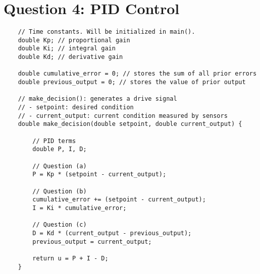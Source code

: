 \documentclass{article}
\begin{document}
	\section*{Question 4: PID Control}
	\begin{lstlisting}
	// Time constants. Will be initialized in main().
	double Kp; // proportional gain
	double Ki; // integral gain
	double Kd; // derivative gain
	
	double cumulative_error = 0; // stores the sum of all prior errors
	double previous_output = 0; // stores the value of prior output
	
	// make_decision(): generates a drive signal
	// - setpoint: desired condition
	// - current_output: current condition measured by sensors
	double make_decision(double setpoint, double current_output) {
	
		// PID terms
		double P, I, D;
		
		// Question (a)
		P = Kp * (setpoint - current_output);
		
		// Question (b)
		cumulative_error += (setpoint - current_output);
		I = Ki * cumulative_error;
		
		// Question (c)
		D = Kd * (current_output - previous_output);
		previous_output = current_output;
		
		return u = P + I - D;
	}
	\end{lstlisting}
\end{document}
